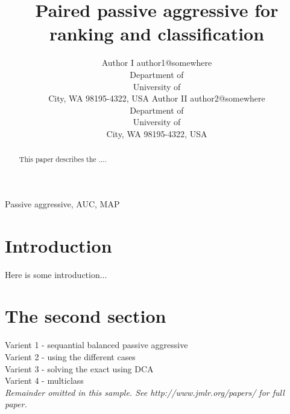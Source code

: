 \documentclass[twoside,11pt]{article}
\begin{document}
\title{Paired passive aggressive for ranking and classification}

\author{       \name Author I \email author1@somewhere \\
       \addr Department of \\
       University of \\
       City, WA 98195-4322, USA
       \AND
       \name Author II \email author2@somewhere \\
       \addr Department of \\
       University of \\
       City, WA 98195-4322, USA
       }

\maketitle

\begin{abstract}%
This paper describes the ....
\end{abstract}

\begin{keywords}
  Passive aggressive, AUC, MAP
\end{keywords}

\section{Introduction}

Here is some introduction...\\


\section{The second section }
Varient 1 - sequantial balanced passive aggressive \\
Varient 2 - using the different cases \\
Varient 3 - solving the exact using DCA \\
Varient 4 - multiclass \\

{\noindent \em Remainder omitted in this sample. See http://www.jmlr.org/papers/ for full paper.}


\end{document}
